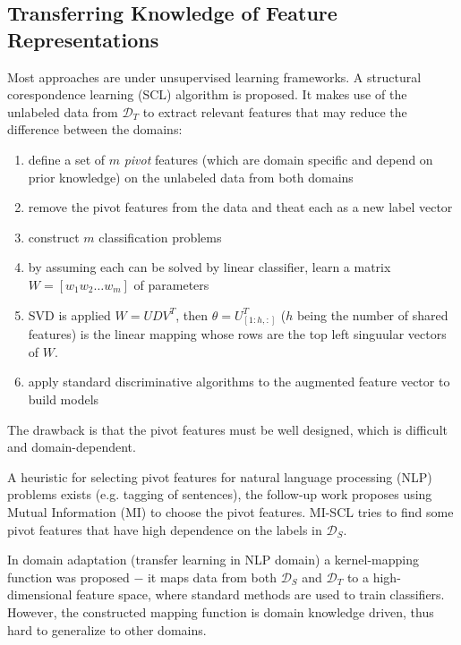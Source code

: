\documentclass[a4paper,twocolumn]{article}
\newcommand{\D}{\mathcal{D}}
\begin{document}
\subsection{Transferring Knowledge of Feature Representations}
Most approaches are under unsupervised learning frameworks. A structural corespondence learning (SCL) algorithm is proposed. It makes use of the unlabeled data from $\D_T$ to extract relevant features that may reduce the difference between the domains:
\begin{enumerate}
    \item define a set of $m$ \textit{pivot} features (which are domain specific and depend on prior knowledge) on the unlabeled data from both domains
    \item remove the pivot features from the data and theat each as a new label vector
    \item construct $m$ classification problems
    \item by assuming each can be solved by linear classifier, learn a matrix $W = [w_1 w_2 \ldots w_m]$ of parameters
    \item SVD is applied $W = UDV^T$, then $\theta = U_{[1:h,:]}^T$ ($h$ being the number of shared features) is the linear mapping whose rows are the top left singuular vectors of $W$.
    \item apply standard discriminative algorithms to the augmented feature vector to build models
\end{enumerate}
The drawback is that the pivot features must be well designed, which is difficult and domain-dependent.

A heuristic for selecting pivot features for natural language processing (NLP) problems exists (e.g. tagging of sentences), the follow-up work proposes using Mutual Information (MI) to choose the pivot features. MI-SCL tries to find some pivot features that have high dependence on the labels in $\D_S$.

In domain adaptation (transfer learning in NLP domain) a kernel-mapping function was proposed $-$ it maps data from both $\D_S$ and $\D_T$ to a high-dimensional feature space, where standard methods are used to train classifiers. However, the constructed mapping function is domain knowledge driven, thus hard to generalize to other domains.
\end{document}
